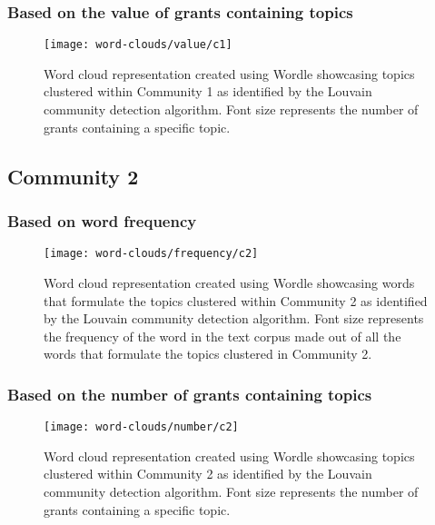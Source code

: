 \subsubsection{Based on the value of grants containing topics}

\begin{figure}[!htbp]
    \centering
    \texttt{[image: word-clouds/value/c1]}
    \caption[Word cloud representation based on the value of grants containing topics clustered within Community 1]{Word cloud representation created using Wordle showcasing topics clustered within Community 1 as identified by the Louvain community detection algorithm. Font size represents the number of grants containing a specific topic.}
    \label{fig:topic_grant_value_c1_appendix}
\end{figure}

\clearpage

\subsection{Community 2}

\subsubsection{Based on word frequency}

\begin{figure}[htbp]
    \centering
    \texttt{[image: word-clouds/frequency/c2]}
    \caption[Word cloud representation based on word frequency showcasing words that formulate the topics clustered within Community 2]{Word cloud representation created using Wordle showcasing words that formulate the topics clustered within Community 2 as identified by the Louvain community detection algorithm. Font size represents the frequency of the word in the text corpus made out of all the words that formulate the topics clustered in Community 2.}
    \label{fig:topic_grant_freq_c2}
\end{figure}

\subsubsection{Based on the number of grants containing topics}

\begin{figure}[htbp]
    \centering
    \texttt{[image: word-clouds/number/c2]}
    \caption[Word cloud representation based on the number of grants containing topics clustered within Community 2]{Word cloud representation created using Wordle showcasing topics clustered within Community 2 as identified by the Louvain community detection algorithm. Font size represents the number of grants containing a specific topic.}
    \label{fig:topic_grant_number_c2}
\end{figure}

